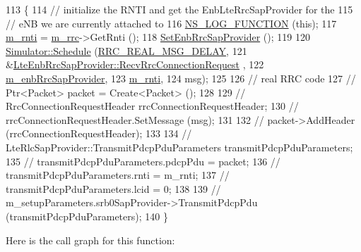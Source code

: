 \begin{DoxyCode}
113 \{
114   \textcolor{comment}{// initialize the RNTI and get the EnbLteRrcSapProvider for the}
115   \textcolor{comment}{// eNB we are currently attached to}
116          \hyperlink{log-macros-disabled_8h_a90b90d5bad1f39cb1b64923ea94c0761}{NS\_LOG\_FUNCTION} (\textcolor{keyword}{this});
117         \hyperlink{classns3_1_1MmWaveLteUeRrcProtocolReal_a7bde08ef55c98508633445e64f71f945}{m\_rnti} = \hyperlink{classns3_1_1MmWaveLteUeRrcProtocolReal_a367394139f43585b3d9acd65d7a44863}{m\_rrc}->GetRnti ();
118   \hyperlink{classns3_1_1MmWaveLteUeRrcProtocolReal_adbb0955b254fae63826a9f90c8dc2113}{SetEnbRrcSapProvider} ();
119 
120   \hyperlink{classns3_1_1Simulator_a671882c894a08af4a5e91181bf1eec13}{Simulator::Schedule} (\hyperlink{namespacens3_a8e3f859197e39602ba3ea59033f00404}{RRC\_REAL\_MSG\_DELAY}, 
121                        &\hyperlink{classns3_1_1LteEnbRrcSapProvider_a6a49a245760fe748a1e959e92c9cc313}{LteEnbRrcSapProvider::RecvRrcConnectionRequest}
      ,
122                        \hyperlink{classns3_1_1MmWaveLteUeRrcProtocolReal_aef9814d08dddfe492640923f74b525fb}{m\_enbRrcSapProvider},
123                        \hyperlink{classns3_1_1MmWaveLteUeRrcProtocolReal_a7bde08ef55c98508633445e64f71f945}{m\_rnti}, 
124                        msg);
125 
126   \textcolor{comment}{// real RRC code}
127   \textcolor{comment}{// Ptr<Packet> packet = Create<Packet> ();}
128 
129   \textcolor{comment}{// RrcConnectionRequestHeader rrcConnectionRequestHeader;}
130   \textcolor{comment}{// rrcConnectionRequestHeader.SetMessage (msg);}
131 
132   \textcolor{comment}{// packet->AddHeader (rrcConnectionRequestHeader);}
133 
134   \textcolor{comment}{// LteRlcSapProvider::TransmitPdcpPduParameters transmitPdcpPduParameters;}
135   \textcolor{comment}{// transmitPdcpPduParameters.pdcpPdu = packet;}
136   \textcolor{comment}{// transmitPdcpPduParameters.rnti = m\_rnti;}
137   \textcolor{comment}{// transmitPdcpPduParameters.lcid = 0;}
138 
139   \textcolor{comment}{// m\_setupParameters.srb0SapProvider->TransmitPdcpPdu (transmitPdcpPduParameters);}
140 \}
\end{DoxyCode}


Here is the call graph for this function\+:


